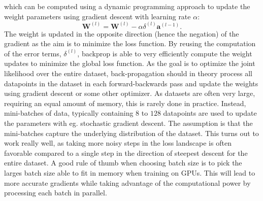 \documentclass[a4paper,11pt]{article} %
\begin{document}
which can be computed using a dynamic programming approach to update the weight parameters using gradient descent with learning rate $\alpha$:
\begin{equation} \label{eq:weight-update}
  \mathbf{W}^{(l)} = \mathbf{W}^{(l)} -\alpha \delta^{(l)} \mathbf{a}^{(l-1)}.
\end{equation}
The weight is updated in the opposite direction (hence the negation) of the gradient as the aim is to minimize the loss function. By reusing the computation of the error terms, $\delta^{(l)}$, backprop is able to very efficiently compute the weight updates to minimize the global loss function. As the goal is to optimize the joint likelihood over the entire dataset, back-propagation should in theory process all datapoints in the dataset in each forward-backwards pass and update the weights using gradient descent or some other optimizer. As datasets are often very large, requiring an equal amount of memory, this is rarely done in practice. Instead, mini-batches of data, typically containing $8$ to $128$ datapoints are used to update the parameters with eg. stochastic gradient descent. The assumption is that the mini-batches capture the underlying distribution of the dataset. This turns out to work really well, as taking more noisy steps in the loss landscape is often favorable compared to a single step in the direction of steepest descent for the entire dataset. A good rule of thumb when choosing batch size is to pick the larges batch size able to fit in memory when training on GPUs. This will lead to more accurate gradients while taking advantage of the computational power by processing each batch in parallel. 
\end{document}
